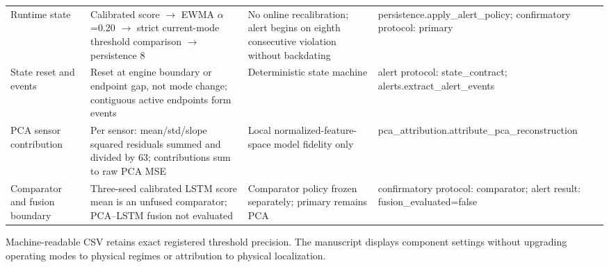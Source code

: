\begin{table}[t]
\begin{tabular}{p{}p{}p{}p{}}
Runtime state & Calibrated score $\rightarrow$ EWMA $\alpha$=0.20 $\rightarrow$ strict current-mode threshold comparison $\rightarrow$ persistence 8 & No online recalibration; alert begins on eighth consecutive violation without backdating & persistence.apply\_alert\_policy; confirmatory protocol: primary \\
State reset and events & Reset at engine boundary or endpoint gap, not mode change; contiguous active endpoints form events & Deterministic state machine & alert protocol: state\_contract; alerts.extract\_alert\_events \\
PCA sensor contribution & Per sensor: mean/std/slope squared residuals summed and divided by 63; contributions sum to raw PCA MSE & Local normalized-feature-space model fidelity only & pca\_attribution.attribute\_pca\_reconstruction \\
Comparator and fusion boundary & Three-seed calibrated LSTM score mean is an unfused comparator; PCA--LSTM fusion not evaluated & Comparator policy frozen separately; primary remains PCA & confirmatory protocol: comparator; alert result: fusion\_evaluated=false \\
\hline
\end{tabular}
\vspace{0.5ex}
\parbox{0.98\textwidth}{\footnotesize Machine-readable CSV retains exact registered threshold precision. The manuscript displays component settings without upgrading operating modes to physical regimes or attribution to physical localization.}
\end{table}
